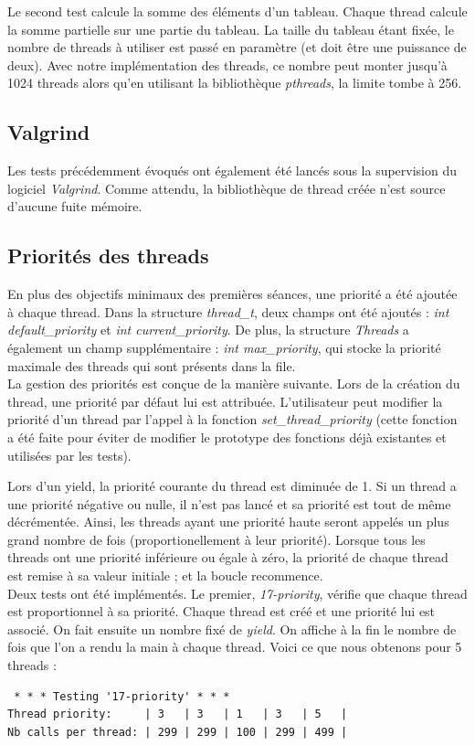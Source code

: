 \documentclass[a4paper,11pt]{article}
\begin{document}
Le second test calcule la somme des éléments d'un tableau. Chaque thread calcule  la somme partielle sur une partie du tableau. La taille du tableau étant fixée, le nombre de threads à utiliser est passé en paramètre (et doit être une puissance de deux). Avec notre implémentation des threads, ce nombre peut monter jusqu'à 1024 threads alors qu'en utilisant la bibliothèque \textit{pthreads}, la limite tombe à 256.

\subsection{Valgrind}

Les tests précédemment évoqués ont également été lancés sous la supervision du logiciel \textit{Valgrind}. Comme attendu, la bibliothèque de thread créée n'est source d'aucune fuite mémoire.

\subsection{Priorités des threads}

En plus des objectifs minimaux des premières séances, une priorité a été ajoutée à chaque thread. Dans la structure \textit{thread\_t}, deux champs ont été ajoutés : \textit{int default\_priority} et \textit{int current\_priority}. De plus, la structure \textit{Threads} a également un champ supplémentaire : \textit{int max\_priority}, qui stocke la priorité maximale des threads qui sont présents dans la file.\\

La gestion des priorités est conçue de la manière suivante. Lors de la création du thread, une priorité par défaut lui est attribuée. L'utilisateur peut modifier la priorité d'un thread par l'appel à la fonction \textit{set\_thread\_priority} (cette fonction a été faite pour éviter de modifier le prototype des fonctions déjà existantes et utilisées par les tests).

Lors d'un yield, la priorité courante du thread est diminuée de 1. Si un thread a une priorité négative ou nulle, il n'est pas lancé et sa priorité est tout de même décrémentée. Ainsi, les threads ayant une priorité haute seront appelés un plus grand nombre de fois (proportionellement à leur priorité). Lorsque tous les threads ont une priorité inférieure ou égale à zéro, la priorité de chaque thread est remise à sa valeur initiale ; et la boucle recommence.\\

Deux tests ont été implémentés. Le premier, \textit{17-priority}, vérifie que chaque thread est proportionnel à sa priorité. Chaque thread est créé et une priorité lui est associé. On fait ensuite un nombre fixé de \textit{yield}. On affiche à la fin le nombre de fois que l'on a rendu la main à chaque thread. Voici ce que nous obtenons pour 5 threads :
\begin{verbatim}
 * * * Testing '17-priority' * * *
Thread priority:     | 3   | 3   | 1   | 3   | 5   |
Nb calls per thread: | 299 | 299 | 100 | 299 | 499 |
\end{verbatim}
\end{document}
